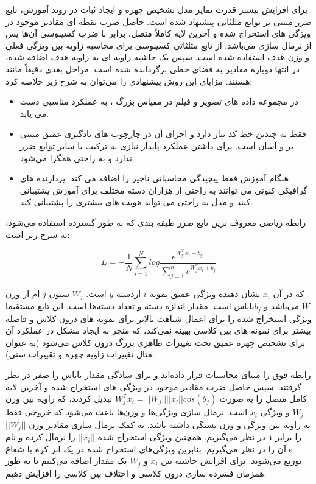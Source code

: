 \noindent
برای افزایش بیشتر قدرت تمایز مدل تشخیص چهره و ایجاد ثبات در روند آموزش، تابع ضرر مبتنی بر توابع مثلثاتی پیشنهاد شده است. حاصل ضرب نقطه ای مقادیر موجود در ویژگی های استخراج شده و آخرین لایه کاملاً متصل، برابر با ضرب کسینوسی آن‌ها پس از نرمال سازی می‌باشد‌. از تابع مثلثاتی کسینوسی برای محاسبه زاویه بین ویژگی فعلی و وزن هدف استفاده شده ‌است. سپس یک حاشیه زاویه ای به زاویه هدف اضافه شده‌، در انتها دوباره مقادیر به فضای خطی برگردانده شده است. مراحل بعدی دقیقاً مانند  هستند. مزایای این روش پیشنهادی را می‌توان به شرح زیر خلاصه کرد:
\begin{itemize}
 \item
در مجموعه داده های تصویر و فیلم در مقیاس بزرگ ، به عملکرد مناسبی دست می یابد.
 \item
فقط به چندین خط کد نیاز دارد و اجرای آن در چارچوب های یادگیری عمیق مبتنی بر  و  آسان است. برای داشتن عملکرد پایدار نیازی به ترکیب با سایر توابع ضرر ندارد و به راحتی همگرا می‌شود.
 \item
هنگام آموزش فقط پیچیدگی محاسباتی ناچیز را اضافه می کند. پردازنده های گرافیکی کنونی می توانند به راحتی از هزاران دسته مختلف برای آموزش پشتیبانی کنند و مدل به راحتی می تواند هویت های بیشتری را پشتیبانی کند.
\end{itemize}
 
\noindent
رابطه ریاضی  معروف ترین تابع ضرر طبقه بندی که به طور گسترده استفاده می‌شود، به شرح زیر است:

\begin{equation}\label{eq3-14}
L= - \frac{1}{N} \sum_{i=1}^{N} log \frac{e^{{W_{y_i}^T} x_i + b_{y_i}}}{\sum_{j=1}^{n} e^{{W_j^T} x_i + b_j}} 
\end{equation}

\noindent
که در آن $x_i$ نشان دهنده ویژگی عمیق نمونه $i$ ازدسته $y$ است. $W_j$ ستون $j$  ام از وزن $W$ می‌باشد و $b_j$بایاس است. مقدار  اندازه دسته و  تعداد دسته‌ها است. این تابع مستقیما ویژگی استخراج شده را برای اعمال شباهت بالاتر برای نمونه های درون کلاس و فاصله بیشتر برای نمونه های بین کلاسی بهینه نمی‌کند، که منجر به ایجاد مشکل در عملکرد آن برای تشخیص چهره عمیق تحت تغییرات ظاهری بزرگ درون کلاس می‌شود (به عنوان مثال تغییرات زاویه چهره و تقییرات سنی).

\noindent
رابطه فوق را مبنای محاسبات قرار داده‌اند و برای سادگی مقدار بایاس را صفر در نظر گرفتند. سپس حاصل ضرب مقادیر موجود در ویژگی های استخراج شده و آخرین لایه کامل متصل را به صورت
$W_j^T x_i = ||W_j|| ||x_i|| cos(θ_j)$
تبدیل کردند، که  زاویه بین وزن $W_j$ و ویژگی $x_i$ است. نرمال سازی ویژگی‌ها و وزن‌ها باعث می‌شود که خروجی فقط به زاویه بین ویژگی و وزن بستگی داشته باشد. به کمک نرمال سازی مقادیر وزن $||W_j||$ را برابر ۱ در نظر می‌گیریم. همچنین ویژگی استخراج شده $||x_i||$ را نرمال کرده و نام آن را  در نظر می‌گیریم. ‌‌‌بنابرین ویژگی‌های استخراج شده در یک ابر کره با شعاع s توزیع می‌شوند. برای افزایش حاشیه بین $x_i$ و $W_j$ یک مقدار اضافه می‌کنیم تا به طور همزمان فشرده سازی درون کلاسی و اختلاف بین کلاسی را افزایش دهیم.

